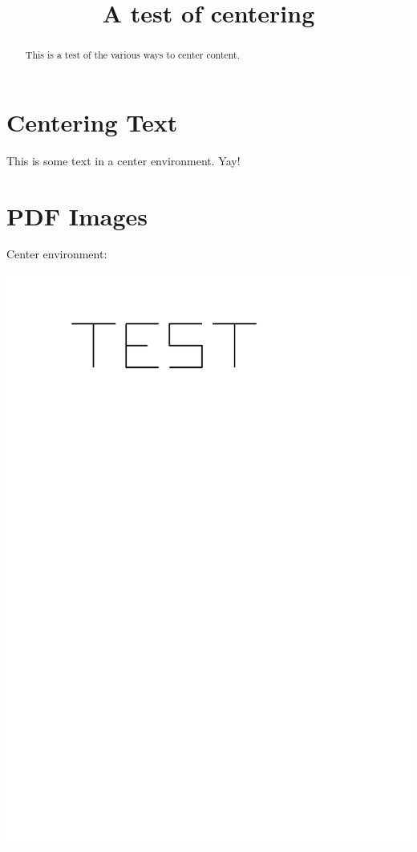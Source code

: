 \documentclass{ximera}
\title{A test of centering}
\begin{document}
\begin{abstract}
This is a test of the various ways to center content.
\end{abstract}
\maketitle

\section{Centering Text}

\begin{center}
This is some text in a center environment. Yay!
\end{center}



\section{PDF Images}

Center environment: 

\begin{center}
\includegraphics{TestImagePDF}
\end{center}
\end{document}
